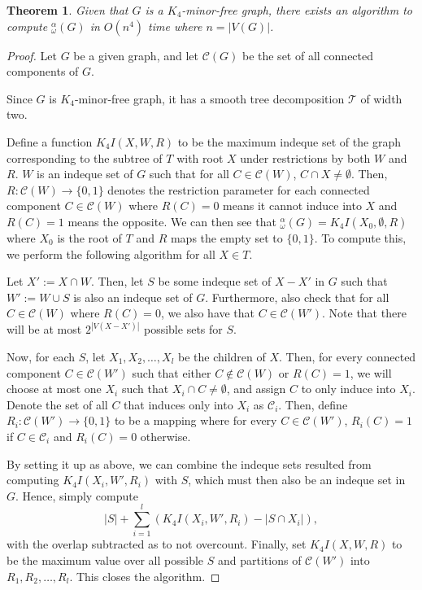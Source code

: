 \documentclass{article}
\newtheorem{thm}{Theorem}[section]
\newcommand{\idq}{{}^{\alpha}_{\omega}}
\begin{document}
\begin{thm}
    Given that $G$ is a $K_4$-minor-free graph, there exists an algorithm to compute $\idq(G)$ in $O(n^4)$ time where $n = |V(G)|$.
\end{thm}
\begin{proof}
    Let $G$ be a given graph, and let $\mathcal C(G)$ be the set of all connected components of  $G$.

 Since $G$ is $K_4$-minor-free graph, it has a smooth tree decomposition $\mathcal T$ of width two. 
 
 Define a function $K_4I(X, W, R)$ to be the maximum indeque set of the graph corresponding to the subtree of $T$ with root $X$ under restrictions by both $W$ and $R$. $W$ is an indeque set of $G$ such that for all $C \in \mathcal{C}(W)$, $C \cap X \neq \emptyset$. Then, $R:\mathcal{C}(W)\to \{0, 1\}$ denotes the restriction parameter for each connected component $C \in \mathcal{C}(W)$ where $R(C) = 0$ means it cannot induce into $X$ and $R(C) = 1$ means the opposite. We can then see that $\idq(G) = K_4I(X_0, \emptyset,R)$ where $X_0$ is the root of $T$ and $R$ maps the empty set to $\{0, 1\}$. To compute this, we perform the following algorithm for all $X \in T$. %

    Let $X' := X \cap W$. Then, let $S$ be some indeque set of $X - X'$ in $G$ such that $W' := W \cup S$ is also an indeque set of $G$. Furthermore, also check that for all $C \in \mathcal{C}(W)$ where $R(C) = 0$, we also have that $C \in \mathcal{C}(W')$. Note that there will be at most $2^{|V(X -X')|}$ possible sets for $S$.

    Now, for each $S$, let $X_1, X_2, \ldots, X_l$ be the children of $X$. Then, for every connected component $C \in \mathcal{C}(W')$ such that either $C \notin \mathcal{C}(W)$ or $R(C) = 1$, we will choose at most one $X_i$ such that $X_i \cap C \neq \emptyset$, and assign $C$ to only induce into $X_i$. Denote the set of all $C$ that induces only into $X_i$ as $\mathcal C_i$. Then, define $R_i:\mathcal{C}(W')\to \{0, 1\}$ to be a mapping where for every $C \in \mathcal{C}(W')$, $R_i(C) = 1$ if $C \in \mathcal C_i$ and $R_i(C) = 0$ otherwise.

    By setting it up as above, we can combine the indeque sets resulted from computing $K_4I(X_i, W', R_i)$ with $S$, which must then also be an indeque set in $G$. Hence, simply compute $$|S| + \sum_{i=1}^l(K_4I(X_i, W', R_i) - |S \cap X_i|),$$ with the overlap subtracted as to not overcount. Finally, set $K_4I(X, W, R)$ to be the maximum value over all possible $S$ and partitions of $\mathcal{C}(W')$ into $R_1, R_2, \ldots, R_l$. This closes the algorithm.


\end{proof}
\end{document}
